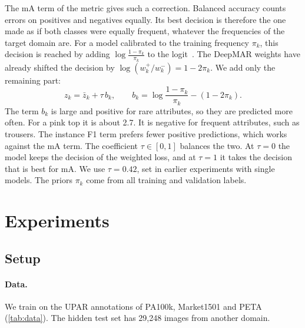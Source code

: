 \documentclass[10pt,twocolumn,letterpaper]{article}
\begin{document}
The mA term of the metric gives such a correction. Balanced accuracy counts errors on positives and negatives equally. Its best decision is therefore the one made as if both classes were equally frequent, whatever the frequencies of the target domain are. For a model calibrated to the training frequency $\pi_k$, this decision is reached by adding $\log\frac{1-\pi_k}{\pi_k}$ to the logit~\cite{saerens,logitadj}. The DeepMAR weights have already shifted the decision by $\log(w_k^{+}/w_k^{-})=1-2\pi_k$. We add only the remaining part:
\begin{equation}
z_k=\bar z_k+\tau\,b_k,\qquad b_k=\log\frac{1-\pi_k}{\pi_k}-(1-2\pi_k).
\label{eq:rule}
\end{equation}
The term $b_k$ is large and positive for rare attributes, so they are predicted more often. For a pink top it is about 2.7. It is negative for frequent attributes, such as trousers. The instance F1 term prefers fewer positive predictions, which works against the mA term. The coefficient $\tau\in[0,1]$ balances the two. At $\tau=0$ the model keeps the decision of the weighted loss, and at $\tau=1$ it takes the decision that is best for mA. We use $\tau=0.42$, set in earlier experiments with single models. The priors $\pi_k$ come from all training and validation labels.

\section{Experiments}
\label{sec:experiments}

\subsection{Setup}
\label{sec:setup}

\paragraph{Data.} We train on the UPAR annotations of PA100k, Market1501 and PETA (\cref{tab:data}). The hidden test set has 29{,}248 images from another domain.

\begin{table}[t]
\centering\small
\setlength{\tabcolsep}{3pt}
\caption{Training data of UPAR 2027 Track~1.}
\label{tab:data}
\end{table}
\end{document}
